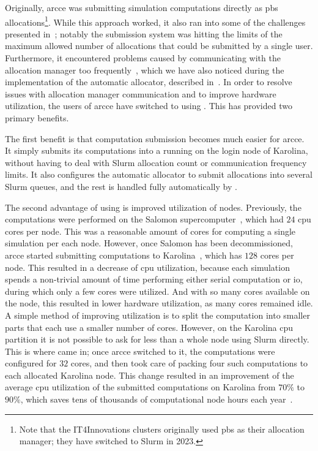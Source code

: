 Originally, \gls{arcce} was submitting simulation computations directly as
\gls{pbs} allocations\footnote{Note that the IT4Innovations clusters originally used \gls{pbs} as their allocation
manager; they have switched to Slurm in 2023.}. While this approach worked, it also ran
into some of the challenges presented in~; notably the submission system was
hitting the limits of the maximum allowed number of allocations that could be submitted by a single
user. Furthermore, it encountered problems caused by communicating with the allocation manager too
frequently~\cite{atlas-it4i-2}, which we have also noticed during the implementation of the
\hyperqueue{} automatic allocator, described in~. In order to
resolve issues with allocation manager communication and to improve hardware utilization, the users
of \gls{arcce} have switched to using \hyperqueue{}. This has provided two
primary benefits.

The first benefit is that computation submission becomes much easier for \gls{arcce}.
It simply submits its computations into a \hyperqueue{} running on the login node of
Karolina, without having to deal with Slurm allocation count or communication frequency limits. It
also configures the automatic allocator to submit allocations into several Slurm queues, and the
rest is handled fully automatically by \hyperqueue{}.

The second advantage of using \hyperqueue{} is improved utilization of nodes. Previously,
the computations were performed on the Salomon supercomputer~\cite{salomon}, which had
$24$ \gls{cpu} cores per node. This was a reasonable amount of
cores for computing a single simulation per each node. However, once Salomon has been
decommissioned, \gls{arcce} started submitting computations to
Karolina~\cite{karolina}, which has $128$ cores per node. This resulted in
a decrease of \gls{cpu} utilization, because each simulation spends a non-trivial
amount of time performing either serial computation or \gls{io}, during which only a
few cores were utilized. And with so many cores available on the node, this resulted in lower
hardware utilization, as many cores remained idle. A simple method of improving utilization is to
split the computation into smaller parts that each use a smaller number of cores. However, on the
Karolina \gls{cpu} partition it is not possible to ask for less than a whole node
using Slurm directly. This is where \hyperqueue{} came in; once \gls{arcce}
switched to it, the computations were configured for $32$ cores, and
\hyperqueue{} then took care of packing four such computations to each allocated Karolina
node. This change resulted in an improvement of the average \gls{cpu} utilization of
the submitted computations on Karolina from $70\%$ to $90\%$, which
saves tens of thousands of computational node hours each year~\cite{cern-hq}.

